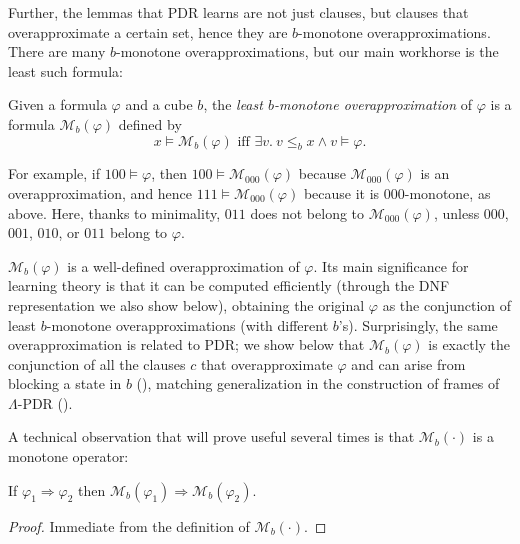 \documentclass[acmsmall,screen]{acmart}
\newcommand{\toolong}[1]{#1}
\newcommand{\toolong}[1]{}
\renewcommand{\implies}{\Longrightarrow}
\newcommand{\monox}[2]{\mathcal{M}_{#2}({#1})}
\begin{document}
\begin{changebar}
Further, the lemmas that PDR learns are not just clauses, but clauses that overapproximate a certain set, hence they are $b$-monotone overapproximations. There are many $b$-monotone overapproximations, but our main workhorse is the least such formula:
\begin{definition}
\label{def:monox}
Given a formula $\varphi$ and a cube $b$, the \emph{least $b$-monotone overapproximation} of $\varphi$ is a formula $\monox{\varphi}{b}$ defined by
\begin{equation*}
	x \models \monox{\varphi}{b} \mbox{ iff } \exists v. \ v \leq_b x 	\land	 v \models \varphi.
\end{equation*}
\end{definition}
%
%
%
%
%
%
%
%
%
%
%
For example, if $100 \models \varphi$, then $100 \models \monox{\varphi}{000}$ because $\monox{\varphi}{000}$ is an overapproximation, and hence $111 \models \monox{\varphi}{000}$ because it is $000$-monotone, as above.
Here, thanks to minimality, $011$ does not belong to $\monox{\varphi}{000}$, unless $000$, $001$, $010$, or $011$ belong to $\varphi$.

$\monox{\varphi}{b}$ is a well-defined overapproximation of $\varphi$. Its main significance for learning theory is that it can be computed efficiently (through the DNF representation we also show below), obtaining the original $\varphi$ as the conjunction of least $b$-monotone overapproximations (with different $b$'s).
Surprisingly, the same overapproximation is related to PDR; we show below that $\monox{\varphi}{b}$ is exactly the conjunction of all the clauses $c$ that overapproximate $\varphi$ and can arise from blocking a state in $b$ (), matching generalization in the construction of frames of $\Lambda$-PDR ().
%
%
%
%
%
%

\end{changebar}

%
%

A technical observation that will prove useful several times is that $\monox{\cdot}{b}$ is a monotone operator:
\begin{lemma}
\label{lem:bshouty-monox-monotone}
If $\varphi_1 \implies \varphi_2$ then $\monox{\varphi_1}{b} \implies \monox{\varphi_2}{b}$.
\end{lemma}
\toolong{
\begin{proof}
Immediate from the definition of $\monox{\cdot}{b}$.
\end{proof}	
}
\end{document}
